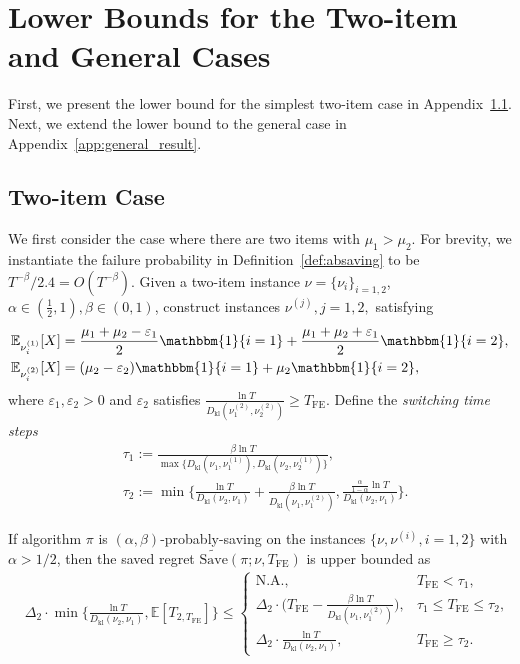 \documentclass[twoside,11pt]{article}
\newcommand{\kl}{D_{\mathrm{kl}}}
\newcommand{\bbE}{\mathbb{E}}
\newcommand{\Tfe}{T_{\mathrm{FE}}}
\newcommand{\Saved}{\mathrm{Save}}
\begin{document}
\section{Lower Bounds for the Two-item and General Cases}\label{app:more_lwbd}
First, we present the lower bound for the simplest two-item case in Appendix~\ref{app:two_arm_result}. Next, we extend the lower bound to the general case in Appendix~\ref{app:general_result}.

\subsection{Two-item Case}\label{app:two_arm_result}
We first consider the case where there are   two items with $\mu_1>\mu_2$.
For brevity, we instantiate the failure probability in Definition~\ref{def:absaving} to be $T^{-\beta}/2.4=O(T^{-\beta}).$
Given a two-item instance $\nu=\{\nu_i\}_{i=1,2}$, $\alpha\in(\frac{1}{2},1),\beta\in(0,1)$, construct instances $\nu^{(j)},j=1,2,$ satisfying
\begin{align}
    &\bbE_{\nu_i^{(1)}}[X]=
        \frac{\mu_1+\mu_2-\varepsilon_1}{2}\mathbbm{1}\{i=1\}
        +\frac{\mu_1+\mu_2+\varepsilon_1}{2}\mathbbm{1}\{i=2\},
        \\
    &\bbE_{\nu_i^{(2)}}[X]=
        (\mu_2-\varepsilon_2)\mathbbm{1}\{i=1\}+\mu_2\mathbbm{1}\{i=2\},
\end{align}
where $\varepsilon_1,\varepsilon_2>0$ and $\varepsilon_2$ satisfies
$\frac{\ln T}{\kl(\nu_1^{(2)},\nu_2^{(2)})}\geq \Tfe$. Define the \emph{switching time steps}
\begin{align}\label{equ:two_item_switch_time}
    &\tau_1:=\frac{\beta\ln T}{ \max\big\{\kl(\nu_1,\nu_1^{(1)}),\kl(\nu_2,\nu_2^{(1)})\big\}},
    \\
    &
    \tau_2:=\min\bigg\{\frac{\ln T}{\kl(\nu_2,\nu_1)}+\frac{\beta\ln T}{\kl(\nu_1,\nu_1^{(2)})}, \frac{\frac{\alpha}{1-\alpha}\ln T}{\kl(\nu_2,\nu_1)}\bigg\}.
\end{align}
\begin{theorem}\label{thm:lwbd_2arm}
    If algorithm $\pi$ is $(\alpha, \beta)$-probably-saving on the instances $\{\nu,\nu^{(i)},i=1,2\}$ with $\alpha>1/2$, then the saved regret $\widetilde{\Saved}(\pi;\nu,\Tfe)$ is upper bounded as
    \begin{align}
        &\Delta_2\cdot\min\bigg\{\frac{\ln T}{\kl(\nu_2,\nu_1)},\bbE[T_{2,\Tfe}]\bigg\}
        \leq
        \begin{cases}
            \mbox{N.A.},& \Tfe < \tau_1,
            \\
            \Delta_2\cdot \big(\Tfe-\frac{\beta \ln T}{\kl(\nu_1,\nu_1^{(2)})}\big),& \tau_1\leq \Tfe\leq \tau_2,
            \\
            \Delta_2\cdot \frac{\ln T}{\kl(\nu_2,\nu_1)},& \Tfe\geq \tau_2.
        \end{cases}
    \end{align}
\end{theorem}
\end{document}
